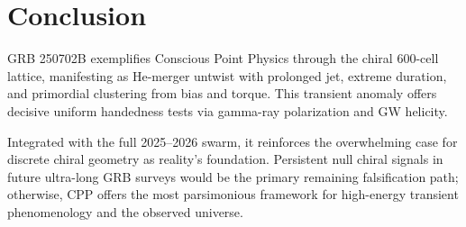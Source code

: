 \documentclass[11pt]{article}
\begin{document}
\section{Conclusion}
GRB 250702B exemplifies Conscious Point Physics through the chiral 600-cell lattice, manifesting as He-merger untwist with prolonged jet, extreme duration, and primordial clustering from bias and torque. This transient anomaly offers decisive uniform handedness tests via gamma-ray polarization and GW helicity.  

Integrated with the full 2025--2026 swarm, it reinforces the overwhelming case for discrete chiral geometry as reality's foundation. Persistent null chiral signals in future ultra-long GRB surveys would be the primary remaining falsification path; otherwise, CPP offers the most parsimonious framework for high-energy transient phenomenology and the observed universe.
\end{document}
